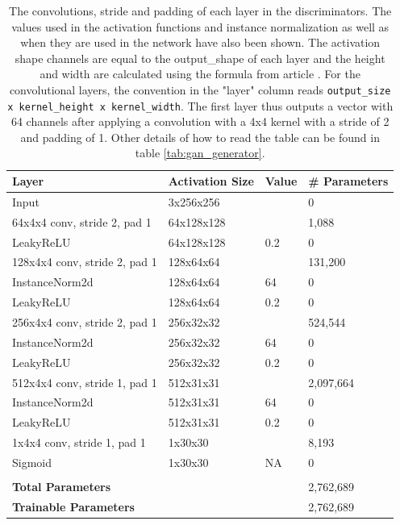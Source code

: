 \documentclass[12pt, fleqn, titlepage]{article}
\newcommand{\1}[1]{\mathds{1}\left[#1\right]}
\begin{document}
\begin{table}[H]
	\centering
	\begin{tabular}{llll}\toprule
		Layer                         & Activation Size & Value & \# Parameters \\ \midrule
		Input                         & 3x256x256       &       & 0             \\
		64x4x4 conv, stride 2, pad 1  & 64x128x128      &       & 1,088         \\
		LeakyReLU                     & 64x128x128      & 0.2   & 0             \\
		128x4x4 conv, stride 2, pad 1 & 128x64x64       &       & 131,200       \\
		InstanceNorm2d                & 128x64x64       & 64    & 0             \\
		LeakyReLU                     & 128x64x64       & 0.2   & 0             \\
		256x4x4 conv, stride 2, pad 1 & 256x32x32       &       & 524,544       \\
		InstanceNorm2d                & 256x32x32       & 64    & 0             \\
		LeakyReLU                     & 256x32x32       & 0.2   & 0             \\
		512x4x4 conv, stride 1, pad 1 & 512x31x31       &       & 2,097,664     \\
		InstanceNorm2d                & 512x31x31       & 64    & 0             \\
		LeakyReLU                     & 512x31x31       & 0.2   & 0             \\
		1x4x4 conv, stride 1, pad 1   & 1x30x30         &       & 8,193         \\
		Sigmoid                       & 1x30x30         & NA    & 0             \\
		                              &                 &       &               \\
		\textbf{Total Parameters}     &                 &       & 2,762,689     \\
		\textbf{Trainable Parameters} &                 &       & 2,762,689     \\ \bottomrule
	\end{tabular}
	\caption{The convolutions, stride and padding of each layer in the discriminators. The values used in the activation functions and instance normalization as well as when they are used in the network have also been shown. The activation shape channels are equal to the output\_shape of each layer and the height and width are calculated using the formula from article \protect\cite{calculate_activation_shape}. For the convolutional layers, the convention in the "layer" column reads \texttt{output\_size x kernel\_height x kernel\_width}. The first layer thus outputs a vector with 64 channels after applying a convolution with a 4x4 kernel with a stride of 2 and padding of 1. Other details of how to read the table can be found in table \ref{tab:gan_generator}.}
	\label{tab:discriminator_layers}
\end{table}
\end{document}
